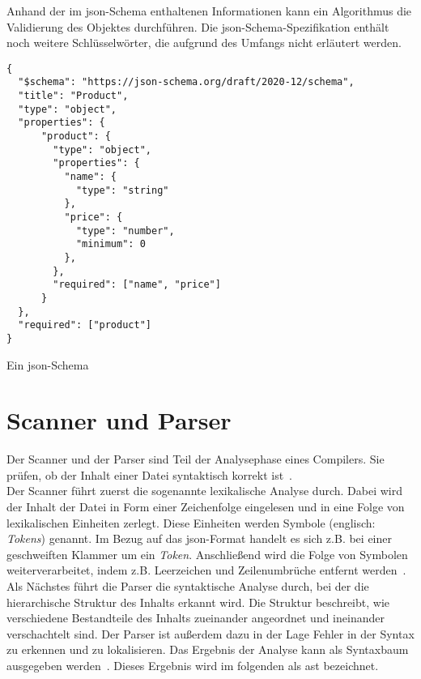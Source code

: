 Anhand der im \acs{json}-Schema enthaltenen Informationen kann ein Algorithmus die Validierung des Objektes durchführen.
Die \acs{json}-Schema-Spezifikation enthält noch weitere Schlüsselwörter, die aufgrund des Umfangs nicht erläutert werden.

\begin{listing}[htp]
      \begin{verbatim}
{
  "$schema": "https://json-schema.org/draft/2020-12/schema",
  "title": "Product",
  "type": "object",
  "properties": {
      "product": {
        "type": "object",
        "properties": {
          "name": {
            "type": "string"
          },
          "price": {
            "type": "number", 
            "minimum": 0
          },
        },
        "required": ["name", "price"]
      }
  },
  "required": ["product"]
}
      \end{verbatim}
      \caption{Ein \acs{json}-Schema}
      \label{lst:json-schema}
\end{listing}

\section{Scanner und Parser}\label{sec:parser}

Der Scanner und der Parser sind Teil der Analysephase eines Compilers. Sie prüfen, ob der Inhalt einer Datei syntaktisch korrekt ist~\cite{SommerGumm+2019+113+148}.
\\
Der Scanner führt zuerst die sogenannte lexikalische Analyse durch. Dabei wird der Inhalt der Datei in Form einer
Zeichenfolge eingelesen und in eine Folge von lexikalischen Einheiten zerlegt.
Diese Einheiten werden Symbole (englisch: \textit{Tokens}) genannt.
Im Bezug auf das \ac{json}-Format handelt es sich z.B. bei einer geschweiften Klammer um ein \textit{Token}.
Anschließend wird die Folge von Symbolen weiterverarbeitet, indem z.B. Leerzeichen und Zeilenumbrüche entfernt werden~\cite{syntax-analysis}.
\\
Als Nächstes führt die Parser die syntaktische Analyse durch, bei der die hierarchische Struktur des Inhalts erkannt wird.
Die Struktur beschreibt, wie verschiedene Bestandteile des Inhalts zueinander angeordnet und ineinander verschachtelt sind.
Der Parser ist außerdem dazu in der Lage Fehler in der Syntax zu erkennen und zu lokalisieren.
Das Ergebnis der Analyse kann als Syntaxbaum ausgegeben werden~\cite{syntax-analysis}.
Dieses Ergebnis wird im folgenden als \ac{ast} bezeichnet.
